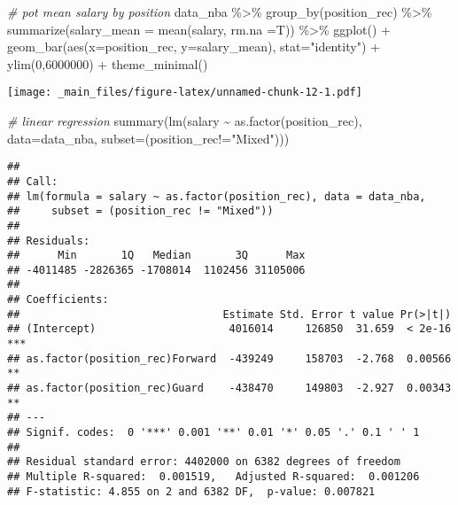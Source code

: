 \documentclass[
]{book}
\newenvironment{Shaded}{\begin{snugshade}}{\end{snugshade}}
\newcommand{\AttributeTok}[1]{\textcolor[rgb]{0.77,0.63,0.00}{#1}}
\newcommand{\CommentTok}[1]{\textcolor[rgb]{0.56,0.35,0.01}{\textit{#1}}}
\newcommand{\DecValTok}[1]{\textcolor[rgb]{0.00,0.00,0.81}{#1}}
\newcommand{\FunctionTok}[1]{\textcolor[rgb]{0.00,0.00,0.00}{#1}}
\newcommand{\NormalTok}[1]{#1}
\newcommand{\SpecialCharTok}[1]{\textcolor[rgb]{0.00,0.00,0.00}{#1}}
\newcommand{\StringTok}[1]{\textcolor[rgb]{0.31,0.60,0.02}{#1}}
\begin{document}
\begin{Shaded}
\begin{Highlighting}[]
\CommentTok{\# pot mean salary by position}
\NormalTok{data\_nba }\SpecialCharTok{\%\textgreater{}\%} \FunctionTok{group\_by}\NormalTok{(position\_rec) }\SpecialCharTok{\%\textgreater{}\%}
  \FunctionTok{summarize}\NormalTok{(}\AttributeTok{salary\_mean =} \FunctionTok{mean}\NormalTok{(salary, }\AttributeTok{rm.na =}\NormalTok{T)) }\SpecialCharTok{\%\textgreater{}\%}
  \FunctionTok{ggplot}\NormalTok{() }\SpecialCharTok{+}
  \FunctionTok{geom\_bar}\NormalTok{(}\FunctionTok{aes}\NormalTok{(}\AttributeTok{x=}\NormalTok{position\_rec, }\AttributeTok{y=}\NormalTok{salary\_mean), }\AttributeTok{stat=}\StringTok{"identity"}\NormalTok{) }\SpecialCharTok{+}
  \FunctionTok{ylim}\NormalTok{(}\DecValTok{0}\NormalTok{,}\DecValTok{6000000}\NormalTok{) }\SpecialCharTok{+}
  \FunctionTok{theme\_minimal}\NormalTok{()}
\end{Highlighting}
\end{Shaded}

\texttt{[image: \_main\_files/figure-latex/unnamed-chunk-12-1.pdf]}

\begin{Shaded}
\begin{Highlighting}[]
\CommentTok{\# linear regression}
\FunctionTok{summary}\NormalTok{(}\FunctionTok{lm}\NormalTok{(salary }\SpecialCharTok{\textasciitilde{}} \FunctionTok{as.factor}\NormalTok{(position\_rec), }\AttributeTok{data=}\NormalTok{data\_nba, }\AttributeTok{subset=}\NormalTok{(position\_rec}\SpecialCharTok{!=}\StringTok{"Mixed"}\NormalTok{)))}
\end{Highlighting}
\end{Shaded}

\begin{verbatim}
## 
## Call:
## lm(formula = salary ~ as.factor(position_rec), data = data_nba, 
##     subset = (position_rec != "Mixed"))
## 
## Residuals:
##      Min       1Q   Median       3Q      Max 
## -4011485 -2826365 -1708014  1102456 31105006 
## 
## Coefficients:
##                                Estimate Std. Error t value Pr(>|t|)    
## (Intercept)                     4016014     126850  31.659  < 2e-16 ***
## as.factor(position_rec)Forward  -439249     158703  -2.768  0.00566 ** 
## as.factor(position_rec)Guard    -438470     149803  -2.927  0.00343 ** 
## ---
## Signif. codes:  0 '***' 0.001 '**' 0.01 '*' 0.05 '.' 0.1 ' ' 1
## 
## Residual standard error: 4402000 on 6382 degrees of freedom
## Multiple R-squared:  0.001519,   Adjusted R-squared:  0.001206 
## F-statistic: 4.855 on 2 and 6382 DF,  p-value: 0.007821
\end{verbatim}
\end{document}
